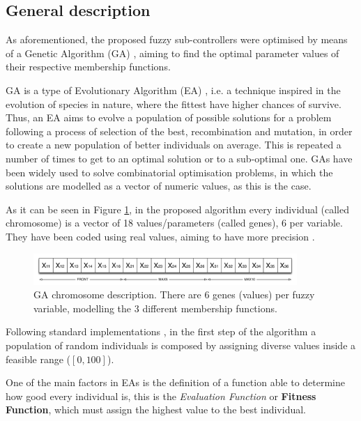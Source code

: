 \documentclass[10pt,journal,compsoc]{IEEEtran}
\begin{document}
\subsection{General description}

As aforementioned, the proposed fuzzy sub-controllers were optimised by means of a Genetic Algorithm (GA) \cite{GAs_Goldberg89}, aiming to find the optimal parameter values of their respective membership functions.

GA is a type of Evolutionary Algorithm (EA) \cite{EAs_Back96}, i.e. a technique inspired in the evolution of species in nature, where the fittest have higher chances of survive. Thus, an EA aims to evolve a population of possible solutions for a problem following a process of selection of the best, recombination and mutation, in order to create a new population of better individuals on average. This is repeated a number of times to get to an optimal solution or to a sub-optimal one.
GAs have been widely used to solve combinatorial optimisation problems, in which the solutions are modelled as a vector of numeric values, as this is the case.

As it can be seen in Figure \ref {fig:cromosome}, in the proposed algorithm every individual (called chromosome) is a vector of 18 values/parameters (called genes), 6 per variable. They have been coded using real values, aiming to have more precision \cite{elsayed13}. 

 \begin{figure}[!ht]	
 	\begin{center}
 		\includegraphics[width=10cm]{fig/chromosome2.png}
 		\caption{GA chromosome description. There are 6 genes (values) per fuzzy variable, modelling the 3 different membership functions.}
 		\label{fig:cromosome}	
 	\end{center}	
 \end{figure}

Following standard implementations \cite{GAs_Goldberg89}, in the first step of the algorithm \cite{salem_evo17} a population of random individuals is composed by assigning diverse values inside a feasible range ($[0,100]$).

One of the main factors in EAs is the definition of a function able to determine how good every individual is, this is the \textit{Evaluation Function} or \textbf{Fitness Function}, which must assign the highest value to the best individual.
\end{document}
